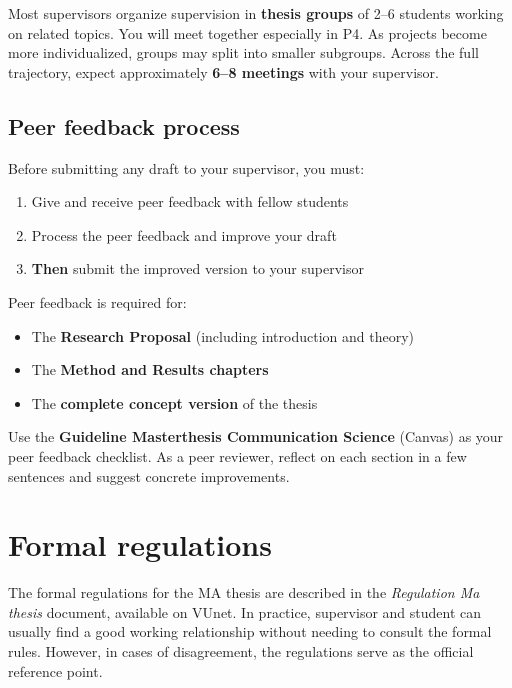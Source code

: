 \documentclass[
  11pt,
  a4paper,
]{scrbook}
\providecommand{\tightlist}{%
  \setlength{\itemsep}{0pt}\setlength{\parskip}{0pt}}\usepackage{longtable,booktabs,array}
\begin{document}
Most supervisors organize supervision in \textbf{thesis groups} of 2--6
students working on related topics. You will meet together especially in
P4. As projects become more individualized, groups may split into
smaller subgroups. Across the full trajectory, expect approximately
\textbf{6--8 meetings} with your supervisor.

\subsection{Peer feedback process}\label{peer-feedback-process}

Before submitting any draft to your supervisor, you must:

\begin{enumerate}
\def\labelenumi{\arabic{enumi}.}
\tightlist
\item
  Give and receive peer feedback with fellow students
\item
  Process the peer feedback and improve your draft
\item
  \textbf{Then} submit the improved version to your supervisor
\end{enumerate}

Peer feedback is required for:

\begin{itemize}
\tightlist
\item
  The \textbf{Research Proposal} (including introduction and theory)
\item
  The \textbf{Method and Results chapters}
\item
  The \textbf{complete concept version} of the thesis
\end{itemize}

Use the \textbf{Guideline Masterthesis Communication Science} (Canvas)
as your peer feedback checklist. As a peer reviewer, reflect on each
section in a few sentences and suggest concrete improvements.

\section{Formal regulations}\label{formal-regulations}

The formal regulations for the MA thesis are described in the
\emph{Regulation Ma thesis} document, available on VUnet. In practice,
supervisor and student can usually find a good working relationship
without needing to consult the formal rules. However, in cases of
disagreement, the regulations serve as the official reference point.
\end{document}
